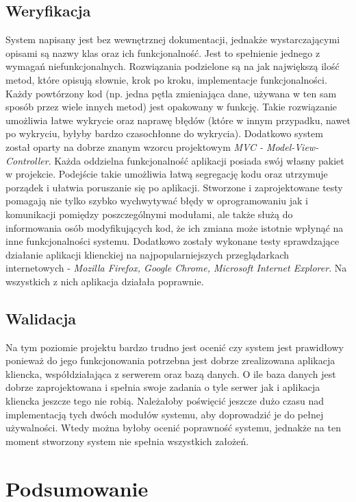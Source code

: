 \documentclass[10pt,titlepage]{article} %
\begin{document}
\subsection{Weryfikacja}
System napisany jest bez wewnętrznej dokumentacji, jednakże wystarczającymi opisami są nazwy klas oraz ich funkcjonalność. Jest to spełnienie jednego z wymagań niefunkcjonalnych. 
Rozwiązania podzielone są na jak największą ilość metod, które opisują słownie, krok po kroku, implementacje funkcjonalności. Każdy powtórzony kod (np. jedna pętla zmieniająca dane, używana w ten sam sposób przez wiele innych metod) jest opakowany w funkcję. Takie rozwiązanie umożliwia łatwe wykrycie oraz naprawę błędów (które w innym przypadku, nawet po wykryciu, byłyby bardzo czasochłonne do wykrycia). Dodatkowo system został oparty na dobrze znanym wzorcu projektowym \textit{MVC - Model-View-Controller}. Każda oddzielna funkcjonalność aplikacji posiada swój własny pakiet w projekcie. Podejście takie umożliwia łatwą segregację kodu oraz utrzymuje porządek i ułatwia poruszanie się po aplikacji. Stworzone i zaprojektowane testy pomagają nie tylko szybko wychwytywać błędy w oprogramowaniu jak i komunikacji pomiędzy poszczególnymi modułami, ale także służą do informowania osób modyfikujących kod, że ich zmiana może istotnie wpłynąć na inne funkcjonalności systemu. Dodatkowo zostały wykonane testy sprawdzające działanie aplikacji klienckiej na najpopularniejszych przeglądarkach internetowych - \textit{Mozilla Firefox, Google Chrome, Microsoft Internet Explorer}. Na wszystkich z nich aplikacja działała poprawnie.
\subsection{Walidacja}
Na tym poziomie projektu bardzo trudno jest ocenić czy system jest prawidłowy ponieważ do jego funkcjonowania potrzebna jest dobrze zrealizowana aplikacja kliencka, współdziałająca z serwerem oraz bazą danych. O ile baza danych jest dobrze zaprojektowana i spełnia swoje zadania o tyle serwer jak i aplikacja kliencka jeszcze tego nie robią. Należałoby poświęcić jeszcze dużo czasu nad implementacją tych dwóch modułów systemu, aby doprowadzić je do pełnej używalności. Wtedy można byłoby ocenić poprawność systemu, jednakże na ten moment stworzony system nie spełnia wszystkich założeń.

\newpage
\section{Podsumowanie}
\end{document}
